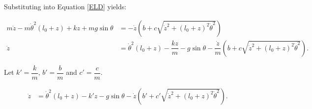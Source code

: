 \documentclass[12pt,a4paper,portrait]{article}
\begin{document}
Substituting into Equation \eqref{ELD} yields:

\begin{align*}
	m\ddot{z} - m\dot{\theta}^2(l_0+z) + kz + mg\sin{\theta} &= -\dot{z}\left(b+c\sqrt{\dot{z}^2+(l_0+z)^2\dot{\theta}^2}\right) \\
	\ddot{z} &= \dot{\theta}^2(l_0+z) - \dfrac{kz}{m} - g\sin{\theta} -\dfrac{\dot{z}}{m}\left(b+c\sqrt{\dot{z}^2+(l_0+z)^2\dot{\theta}^2}\right).
\end{align*}

Let $k'=\dfrac{k}{m}$, $b'=\dfrac{b}{m}$ and $c'=\dfrac{c}{m}$.

\begin{align*}
	\ddot{z} &= \dot{\theta}^2(l_0+z) - k'z - g\sin{\theta} -\dot{z}\left(b'+c'\sqrt{\dot{z}^2+(l_0+z)^2\dot{\theta}^2}\right).
\end{align*}
	
\end{document}
